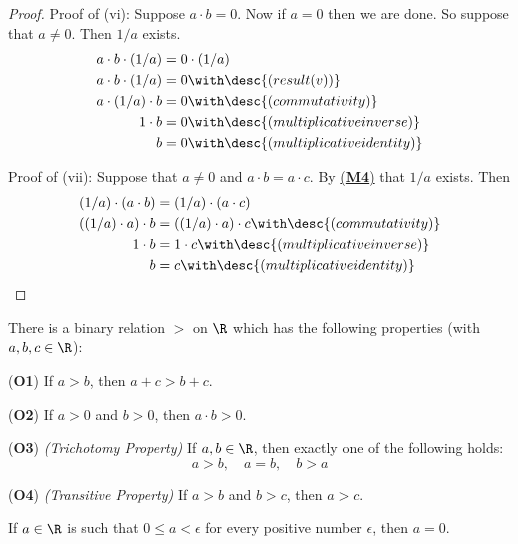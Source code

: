 \begin{proof}
  Proof of (vi): Suppose $a\cdot b=0$. Now if $a=0$ then we are done. So suppose
  that $a\neq0$. Then $1/a$ exists.
  \begin{align*}
    a\cdot b\cdot(1/a) &=0\cdot(1/a)                            \\
    a\cdot b\cdot(1/a) &=0\with\desc{(result (v))}              \\
    a\cdot(1/a)\cdot b &=0\with\desc{(commutativity)}           \\
    1\cdot b           &=0\with\desc{(multiplicative inverse)}  \\
    b                  &=0\with\desc{(multiplicative identity)}
  \end{align*}

  Proof of (vii): Suppose that $a\neq0$ and $a\cdot b=a\cdot c$. By
  \href{bf61f02}{(\textbf{M4})} that $1/a$ exists. Then
  \begin{align*}
    (1/a)\cdot(a\cdot b)  &=(1/a)\cdot(a\cdot c)                             \\
    ((1/a)\cdot a)\cdot b &=((1/a)\cdot a)\cdot c\with\desc{(commutativity)} \\
    1\cdot b              &=1\cdot c\with\desc{(multiplicative inverse)}     \\
    b                     &= c\with\desc{(multiplicative identity)}
  \end{align*}
\end{proof}

\label{d49c63e}

There is a binary relation $>$ on $\R$ which has the following properties (with
$a,b,c\in\R$):

\begin{enumerati}
  \item [(\textbf{O1})] If $a>b$, then $a+c>b+c$.
  \item [(\textbf{O2})] If $a>0$ and $b>0$, then $a\cdot b>0$.
  \item [(\textbf{O3})] \textit{(Trichotomy Property)} If $a,b\in\R$, then
  exactly one of the following holds:
  $$a>b,\quad a=b,\quad b>a$$
  \item [(\textbf{O4})] \textit{(Transitive Property)} If $a>b$ and $b>c$, then
  $a>c$.
\end{enumerati}

\label{b069294}

If $a\in\R$ is such that $0\leq a<\epsilon$ for every positive number
$\epsilon$, then $a=0$.

